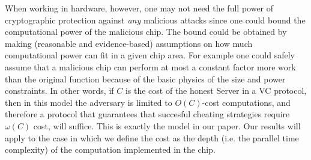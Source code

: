 When working in hardware, however, one may not need the full power of cryptographic protection against {\em any} malicious attacks since one could bound the computational power of the malicious chip. The bound could be obtained by making (reasonable and evidence-based) assumptions on how much computational power can fit in a given chip area. For example one could safely assume that a malicious chip can perform at most a constant factor more work than the original function because of the basic physics of the size and power constraints. In other words, if $C$ is the cost of the honest Server in a VC protocol, then in this model the adversary is limited to $O(C)$-cost computations, and therefore a protocol that guarantees that succesful cheating strategies require $\omega(C)$ cost, will suffice. This is exactly the model in our paper. Our results will apply to the case in which we define the cost as the depth (i.e. the parallel time complexity) of the computation implemented in the chip. 

%


